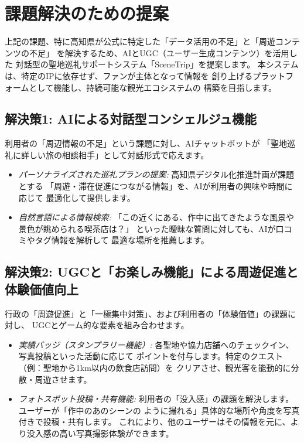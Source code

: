 \documentclass{docs}
\begin{document}
\section{課題解決のための提案}
上記の課題、特に高知県が公式に特定した「データ活用の不足」と「周遊コンテンツの不足」\cite{kochi_dx_plan}
を解決するため、AIとUGC（ユーザー生成コンテンツ）を活用した
対話型の聖地巡礼サポートシステム「SceneTrip」を提案します。
本システムは、特定のIPに依存せず、ファンが主体となって情報を
創り上げるプラットフォームとして機能し、持続可能な観光エコシステムの
構築を目指します。

\subsection{解決策1: AIによる対話型コンシェルジュ機能}
利用者の「周辺情報の不足」という課題に対し、AIチャットボットが
「聖地巡礼に詳しい旅の相談相手」として対話形式で応えます。
\begin{itemize}
	\item \emph{パーソナライズされた巡礼プランの提案:}
	高知県デジタル化推進計画\cite{kochi_dx_plan}が課題とする
	「周遊・滞在促進につながる情報」を、AIが利用者の興味や時間に応じて
	最適化して提供します。
	\item \emph{自然言語による情報検索:}
	「この近くにある、作中に出てきたような風景や景色が眺められる喫茶店は？」
	といった曖昧な質問に対しても、AIが口コミやタグ情報を解析して
	最適な場所を推薦します。
\end{itemize}

\subsection{解決策2: UGCと「お楽しみ機能」による周遊促進と体験価値向上}
行政の「周遊促進」と「一極集中対策」、および利用者の「体験価値」の課題に対し、
UGCとゲーム的な要素を組み合わせます。
\begin{itemize}
	\item \emph{実績バッジ（スタンプラリー機能）:}
	各聖地や協力店舗へのチェックイン、写真投稿といった活動に応じて
	ポイントを付与します。特定のクエスト（例：聖地から1km以内の飲食店訪問）を
	クリアさせ、観光客を能動的に分散・周遊させます。
	\item \emph{フォトスポット投稿・共有機能:}
	利用者の「没入感」の課題を解決します。ユーザーが「作中のあのシーンの
	ように撮れる」具体的な場所や角度を写真付きで投稿・共有します。
	これにより、他のユーザーはその情報を元に、より没入感の高い写真撮影体験ができます。
\end{itemize}
\end{document}
